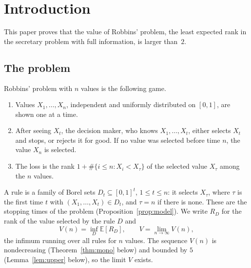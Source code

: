 \documentclass[11pt]{amsart}
\theoremstyle{definition}
\numberwithin{equation}{section}
\newcommand{\E}{\mathbb{E}}
\begin{document}
\clearpage

\section{Introduction}\label{sec:intro}

This paper proves that the value of Robbins' problem, the least expected rank in the secretary problem with full information, is larger than~$2$.

\subsection*{The problem}
Robbins' problem with $n$ values is the following game.
\begin{enumerate}[label=(\arabic*)]
\item Values $X_1,\dots,X_n$, independent and uniformly distributed on $[0,1]$, are shown one at a time.
\item After seeing $X_t$, the decision maker, who knows $X_1,\dots,X_t$, either selects $X_t$ and stops, or rejects it for good. If no value was selected before time $n$, the value $X_n$ is selected.
\item The loss is the rank $1+\#\{i\le n: X_i<X_\tau\}$ of the selected value $X_\tau$ among the $n$ values.
\end{enumerate}
A rule is a family of Borel sets $D_t\subseteq[0,1]^t$, $1\le t\le n$: it selects $X_\tau$, where $\tau$ is the first time $t$ with $(X_1,\dots,X_t)\in D_t$, and $\tau=n$ if there is none. These are the stopping times of the problem (Proposition~\ref{prop:model}). We write $R_D$ for the rank of the value selected by the rule $D$ and
\[
V(n)=\inf_D \E[R_D],\qquad V=\lim_{n\to\infty}V(n),
\]
the infimum running over all rules for $n$ values. The sequence $V(n)$ is nondecreasing (Theorem~\ref{thm:mono} below) and bounded by $5$ (Lemma~\ref{lem:upper} below), so the limit $V$ exists.
\end{document}
